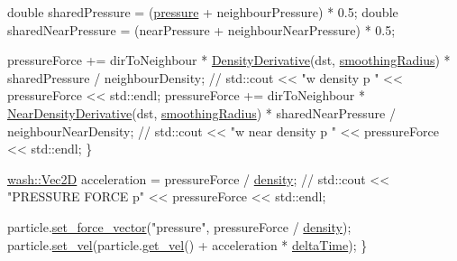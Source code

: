 \begin{DoxyCode}
        \textcolor{keywordtype}{double} sharedPressure = (\mbox{\hyperlink{3d__fluid__sim_2fluid__sim_8cpp_a35ac7259c74fa75da5dc982febe230c0}{pressure}} + neighbourPressure) * 0.5;
        \textcolor{keywordtype}{double} sharedNearPressure = (nearPressure + neighbourNearPressure) * 0.5;

        pressureForce += dirToNeighbour * \mbox{\hyperlink{flsim__kernels_8hpp_a086696bc83d3db97c23fe6b4fbb6581c}{DensityDerivative}}(dst, 
      \mbox{\hyperlink{3d__fluid__sim_2fluid__sim_8cpp_aeb9760a781fb6ccf134ed4353c9888e5}{smoothingRadius}}) * sharedPressure / neighbourDensity;
        \textcolor{comment}{// std::cout << "w density p " << pressureForce << std::endl;}
        pressureForce +=
            dirToNeighbour * \mbox{\hyperlink{flsim__kernels_8hpp_a2bf1a9071d088d903f6d511bb13c4e3e}{NearDensityDerivative}}(dst, 
      \mbox{\hyperlink{3d__fluid__sim_2fluid__sim_8cpp_aeb9760a781fb6ccf134ed4353c9888e5}{smoothingRadius}}) * sharedNearPressure / neighbourNearDensity;
        \textcolor{comment}{// std::cout << "w near density p " << pressureForce << std::endl;}
    \}

    \mbox{\hyperlink{classwash_1_1Vec}{wash::Vec2D}} acceleration = pressureForce / \mbox{\hyperlink{3d__fluid__sim_2fluid__sim_8cpp_a140d94d7edb97c062961056d1926a2db}{density}};
    \textcolor{comment}{// std::cout << "PRESSURE FORCE p" << pressureForce << std::endl;}

    particle.\mbox{\hyperlink{classwash_1_1Particle_a6960cdd169d1829a52e49cf835a8bfeb}{set\_force\_vector}}(\textcolor{stringliteral}{"pressure"}, pressureForce / 
      \mbox{\hyperlink{3d__fluid__sim_2fluid__sim_8cpp_a140d94d7edb97c062961056d1926a2db}{density}});
    particle.\mbox{\hyperlink{classwash_1_1Particle_a4755365883cfd62117ebe74fe44d35e0}{set\_vel}}(particle.\mbox{\hyperlink{classwash_1_1Particle_a890d0f1467225393e385872b0c98b974}{get\_vel}}() + acceleration * \mbox{\hyperlink{3d__fluid__sim_2fluid__sim_8cpp_a78e0adba8d27825f587ec87ed578015f}{deltaTime}});
\}
\end{DoxyCode}



